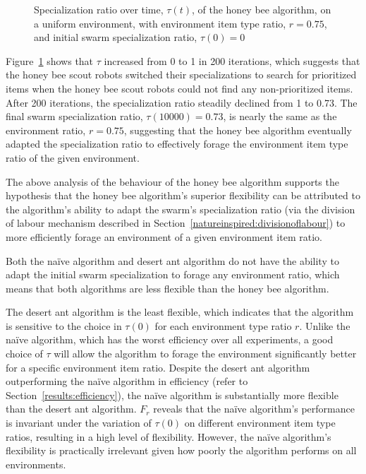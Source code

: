 \begin{figure}[!htb]
\centering
\resizebox{\textwidth}{!}{}
\caption{Specialization ratio over time, $\tau(t)$, of the honey bee algorithm, on a uniform environment, with environment item type ratio, $r=0.75$, and initial swarm specialization ratio, $\tau(0)=0$}
\label{fig:specializationratioovertime}
\end{figure}

Figure~\ref{fig:specializationratioovertime} shows that $\tau$ increased from 0 to 1 in 200 iterations, which suggests that the honey bee scout robots switched their specializations to search for prioritized items when the honey bee scout robots could not find any non-prioritized items. After 200 iterations, the specialization ratio steadily declined from 1 to 0.73. The final swarm specialization ratio, $\tau(10000)=0.73$, is nearly the same as the environment ratio, $r=0.75$, suggesting that the honey bee algorithm eventually adapted the specialization ratio to effectively forage the environment item type ratio of the given environment.

The above analysis of the behaviour of the honey bee algorithm supports the hypothesis that the honey bee algorithm's superior flexibility can be attributed to the algorithm's ability to adapt the swarm's specialization ratio (via the division of labour mechanism described in Section~\ref{natureinspired:divisionoflabour}) to more efficiently forage an environment of a given environment item ratio.

Both the na\"ive algorithm and desert ant algorithm do not have the ability to adapt the initial swarm specialization to forage any environment ratio, which means that both algorithms are  less flexible than the honey bee algorithm. 

The desert ant algorithm is the least flexible, which indicates that the algorithm is sensitive to the choice in $\tau(0)$ for each environment type ratio $r$. Unlike the na\"ive algorithm, which has the worst efficiency over all experiments, a good choice of $\tau$ will allow the algorithm to forage the environment significantly better for a specific environment item ratio. Despite the desert ant algorithm outperforming the na\"ive algorithm in efficiency (refer to Section~\ref{results:efficiency}), the na\"ive algorithm is substantially more flexible than the desert ant algorithm. $F_r$ reveals that the na\"ive algorithm's performance is invariant under the variation of $\tau(0)$ on different environment item type ratios, resulting in a high level of flexibility. However, the na\"ive algorithm's flexibility is practically irrelevant given how poorly the algorithm performs on all environments. 


